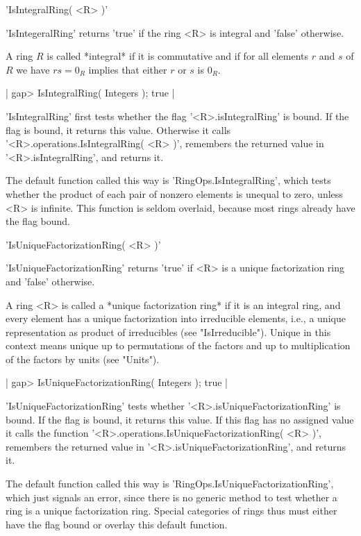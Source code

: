 
'IsIntegralRing( <R> )'

'IsIntegeralRing' returns 'true' if the ring <R>  is integral and 'false'
otherwise.

A ring $R$ is  called *integral* if it  is   commutative and if  for  all
elements $r$ and $s$ of $R$ we have $r s = 0_R$  implies  that either $r$
or $s$ is $0_R$.

|    gap> IsIntegralRing( Integers );
    true |

'IsIntegralRing'  first tests whether  the  flag  '<R>.isIntegralRing' is
bound.  If the flag is bound, it returns  this value.  Otherwise it calls
'<R>.operations.IsIntegralRing( <R> )',  remembers the returned value  in
'<R>.isIntegralRing', and returns it.

The default function called this  way is  'RingOps.IsIntegralRing', which
tests  whether the product of each pair of nonzero elements is unequal to
zero, unless <R> is infinite.  This function is  seldom overlaid, because
most rings already have the flag bound.


'IsUniqueFactorizationRing( <R> )'

'IsUniqueFactorizationRing'    returns   'true'   if  <R>  is  a   unique
factorization ring and 'false' otherwise.

A ring <R> is  called a *unique factorization ring* if it is an  integral
ring,  and  every element has  a  unique  factorization into  irreducible
elements, i.e., a  unique representation as product  of irreducibles (see
"IsIrreducible").  Unique in this context means unique up to permutations
of  the factors  and  up  to multiplication of the factors by units  (see
"Units").

|    gap> IsUniqueFactorizationRing( Integers );
    true |

'IsUniqueFactorizationRing' tests whether '<R>.isUniqueFactorizationRing'
is bound.  If the flag is bound, it returns this value.  If this flag has
no      assigned       value      it       calls       the       function
'<R>.operations.IsUniqueFactorizationRing( <R> )', remembers the returned
value in '<R>.isUniqueFactorizationRing', and returns it.

The      default       function      called       this       way       is
'RingOps.IsUniqueFactorizationRing', which  just signals  an error, since
there  is  no  generic  method  to  test  whether  a  ring  is  a  unique
factorization ring.  Special  categories of  rings thus must  either have
the flag bound or overlay this default function.

